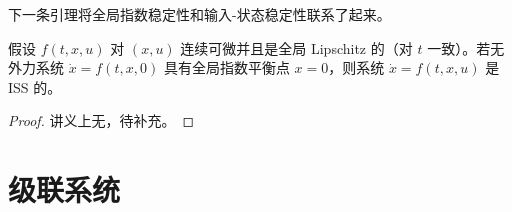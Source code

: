 下一条引理将全局指数稳定性和输入-状态稳定性联系了起来。

\begin{lemma}
    假设 $f(t, x, u)$ 对 $(x, u)$ 连续可微并且是全局 Lipschitz 的（对 $t$ 一致）。若无外力系统 $\dot{x} = f (t, x, 0)$ 具有全局指数平衡点 $x = 0$，则系统 $\dot{x} = f (t, x, u)$ 是 ISS 的。
\end{lemma}

\begin{proof}
    讲义上无，待补充。%
\end{proof}


\section*{级联系统}





